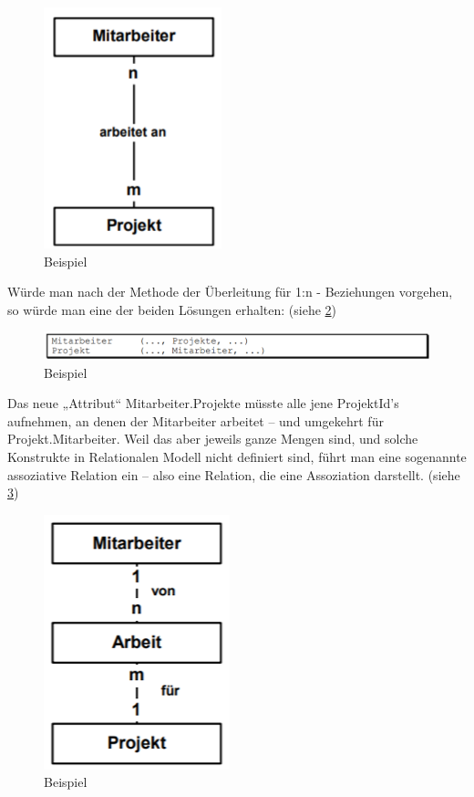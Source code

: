 \begin{figure}[h]
    \centering
    \includegraphics[width=.3\textwidth]{Content/images/modellierung/mitarbeiterprojekt.png}
    \caption{Beispiel}
    \label{fig:modellierung:mitproj}
\end{figure}

Würde man nach der Methode der Überleitung für 1:n - Beziehungen vorgehen, so würde man eine der beiden Lösungen erhalten: (siehe \ref{fig:modellierung:mitproj2})

\begin{figure}[h]
    \centering
    \includegraphics[width=.8\textwidth]{Content/images/modellierung/mitproj.png}
    \caption{Beispiel}
    \label{fig:modellierung:mitproj2}
\end{figure}

Das neue „Attribut“ Mitarbeiter.Projekte müsste alle jene ProjektId’s aufnehmen, an denen der Mitarbeiter arbeitet – und umgekehrt für Projekt.Mitarbeiter. Weil das aber jeweils ganze Mengen sind, und solche Konstrukte in Relationalen Modell nicht definiert sind, führt man eine sogenannte assoziative Relation ein – also eine Relation, die eine Assoziation darstellt. (siehe \ref{fig:modellierung:mitproj3})

\begin{figure}[h]
    \centering
    \includegraphics[width=.3\textwidth]{Content/images/modellierung/mitproj3.png}
    \caption{Beispiel}
    \label{fig:modellierung:mitproj3}
\end{figure}

